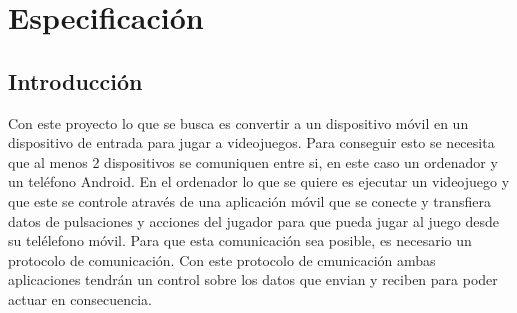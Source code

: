 %
%
%
%
%
%
%
%
%
%

\chapter{Especificaci\'on}
\label{cap4}
\label{cap:especificacion}

\section{Introducci\'on}
\label{cap4:sec:intro}

Con este proyecto lo que se busca es convertir a un dispositivo m\'ovil en un dispositivo de entrada para jugar a videojuegos. Para conseguir esto se necesita que al menos 2 dispositivos se comuniquen entre si, en este caso un ordenador y un tel\'efono Android.
En el ordenador lo que se quiere es ejecutar un videojuego y que este se controle atrav\'es de una aplicaci\'on m\'ovil que se conecte y transfiera datos de pulsaciones y acciones del jugador para que pueda jugar al juego desde su tel\'elefono m\'ovil. Para que esta comunicaci\'on sea posible, es necesario un protocolo de comunicaci\'on. Con este protocolo de cmunicaci\'on ambas aplicaciones tendr\'an un control sobre los datos que envian y reciben para poder actuar en consecuencia.

